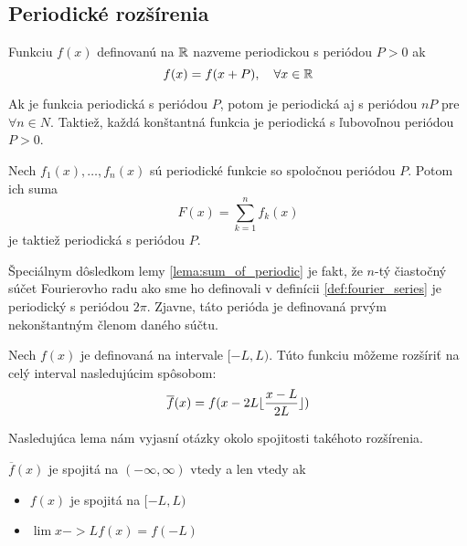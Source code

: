 \subsection{Periodické rozšírenia}

\begin{definicia}
  Funkciu $f(x)$ definovanú na ${\mathbb R}$ nazveme periodickou s periódou
  $P>0$
  ak
  \begin{equation}
    f(x) = f(x+P), \quad \forall x \in {\mathbb R}
  \end{equation}
\end{definicia}
\begin{poznamka}
    Ak je funkcia periodická s periódou $P$, potom je periodická
    aj s periódou $nP$ pre $\forall n \in N$. 
    Taktiež, každá konštantná funkcia je periodická s ľubovoľnou
    periódou $P>0$.
\end{poznamka}

\begin{lema}
    Nech $f_1(x), \dots, f_n(x)$ sú periodické funkcie so spoločnou
    periódou $P$. Potom ich suma
    \begin{equation}
        F(x) = \sum_{k=1}^n f_k(x)
    \end{equation}
    je taktiež periodická s periódou $P$.
    \label{lema:sum_of_periodic}
\end{lema}
Špeciálnym dôsledkom lemy \ref{lema:sum_of_periodic} je fakt, že
 $n$-tý čiastočný súčet Fourierovho radu ako sme ho definovali
 v definícii \ref{def:fourier_series} je periodický s periódou
 $2\pi$. Zjavne, táto perióda je definovaná prvým nekonštantným členom
 daného súčtu.

\begin{definicia}
    Nech $f(x)$ je definovaná na intervale $[-L,L)$. Túto funkciu
    môžeme rozšíriť na celý interval nasledujúcim spôsobom:
    \begin{equation}
      \overline{f}(x) = f(x - 2L \lfloor \frac{x-L}{2L} \rfloor)
    \end{equation}
\end{definicia}

Nasledujúca lema nám vyjasní otázky okolo spojitosti takéhoto
rozšírenia.
\begin{lema}
    $\overline{f}(x)$ je spojitá na $(-\infty,\infty)$ vtedy a len
    vtedy ak
    \begin{itemize}
        \item   $f(x)$ je spojitá na $[-L,L)$
        \item   $\lim {x->L} f(x) = f(-L)$
    \end{itemize}
\end{lema}

